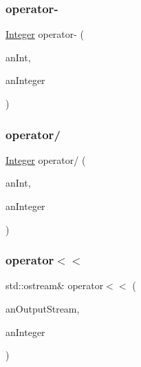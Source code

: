 \subsubsection{\texorpdfstring{operator-\/}{operator-}}
{\footnotesize\ttfamily \hyperlink{classlibrary_1_1core_1_1types_1_1Integer}{Integer} operator-\/ (\begin{DoxyParamCaption}\item[{const \hyperlink{classlibrary_1_1core_1_1types_1_1Integer_a623afb1580f870fd8a1997b1c12c917d}{Integer\+::\+Value\+Type} \&}]{an\+Int,  }\item[{const \hyperlink{classlibrary_1_1core_1_1types_1_1Integer}{Integer} \&}]{an\+Integer }\end{DoxyParamCaption})\hspace{0.3cm}{\ttfamily [friend]}}

\mbox{\label{classlibrary_1_1core_1_1types_1_1Integer_a61328fcdbfeebf2840a138de4f638789}} 
\subsubsection{\texorpdfstring{operator/}{operator/}}
{\footnotesize\ttfamily \hyperlink{classlibrary_1_1core_1_1types_1_1Integer}{Integer} operator/ (\begin{DoxyParamCaption}\item[{const \hyperlink{classlibrary_1_1core_1_1types_1_1Integer_a623afb1580f870fd8a1997b1c12c917d}{Integer\+::\+Value\+Type} \&}]{an\+Int,  }\item[{const \hyperlink{classlibrary_1_1core_1_1types_1_1Integer}{Integer} \&}]{an\+Integer }\end{DoxyParamCaption})\hspace{0.3cm}{\ttfamily [friend]}}

\mbox{\label{classlibrary_1_1core_1_1types_1_1Integer_aec29fc1731201932ab34cfe2ec83fbc9}} 
\subsubsection{\texorpdfstring{operator$<$$<$}{operator<<}}
{\footnotesize\ttfamily std\+::ostream\& operator$<$$<$ (\begin{DoxyParamCaption}\item[{std\+::ostream \&}]{an\+Output\+Stream,  }\item[{const \hyperlink{classlibrary_1_1core_1_1types_1_1Integer}{Integer} \&}]{an\+Integer }\end{DoxyParamCaption})\hspace{0.3cm}{\ttfamily [friend]}}



